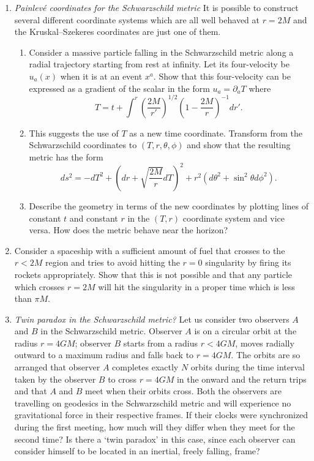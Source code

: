 \documentclass{article}
\begin{document}
\begin{enumerate}
\item {\itshape Painlev{\'e} coordinates for the Schwarzschild metric} It is possible to construct several different coordinate systems which are all well behaved at $r = 2M$ and the Kruskal–Szekeres coordinates are just one of them.
  \begin{enumerate}
  \item Consider a massive particle falling in the Schwarzschild metric along a radial trajectory starting from rest at infinity. Let its four-velocity be $u_a(x)$ when it is at an event $x^a$. Show that this four-velocity can be expressed as a gradient of the scalar in the form $u_a = \partial_aT$ where
    \begin{equation}
      \label{eq:T-plainleve}
      T = t+\int^r\left(\frac{2M}{r'}\right)^{1/2}\left(1-\frac{2M}{r}\right)^{-1}dr'.
    \end{equation}
  \item This suggests the use of $T$ as a new time coordinate. Transform from the
    Schwarzschild coordinates to $(T, r, \theta, \phi)$ and show that the resulting metric has the form
    \begin{equation}
      \label{eq:line-element-plainleve}
      ds^2 =-dT^2 + (dr + \sqrt{\frac{2M}{r}}dT)^2 + r^2(d\theta^2 + \sin^2\theta d\phi^2).
    \end{equation}
  \item Describe the geometry in terms of the new coordinates by plotting lines of constant $t$ and constant $r$ in the $(T, r)$ coordinate system and vice versa. How does the metric behave near the horizon?
  \end{enumerate}
\item Consider a spaceship with a sufficient amount of fuel that crosses to the $r < 2M$ region and tries to avoid hitting the $r = 0$ singularity by firing its rockets appropriately. Show that this is not possible and that any particle which crosses $r = 2M$ will hit the singularity in a proper time which is less than $\pi M$.
\item {\itshape Twin paradox in the Schwarzschild metric?} Let us consider two observers $A$ and $B$ in the Schwarzschild metric. Observer $A$ is on a circular orbit at the radius $r = 4GM$; observer $B$ starts from a radius $r < 4GM$, moves radially outward to a maximum radius and falls back to $r = 4GM.$ The orbits are so arranged that observer $A$ completes exactly $N$ orbits during the time interval taken by the observer $B$ to cross $r = 4GM$ in the onward and the return trips and that $A$ and $B$ meet when their orbits cross. Both the observers are travelling on geodesics in the Schwarzschild metric and will experience no gravitational force in their respective frames. If their clocks were synchronized during the first meeting, how much will they differ when they meet for the second time? Is there a ‘twin paradox’ in this case, since each observer can consider himself to be located in an inertial, freely falling, frame?

\end{enumerate}
\end{document}
